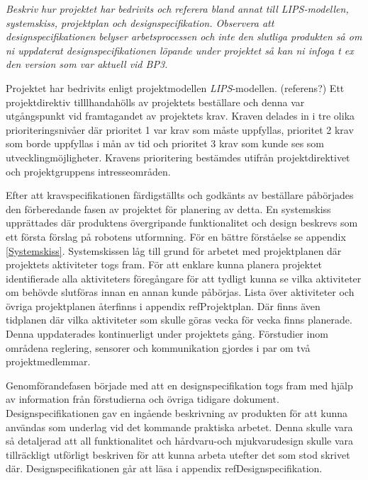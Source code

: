 \documentclass[11pt]{article}
\begin{document}
\begin{flushleft}
\textit{Beskriv hur projektet har bedrivits och referera bland annat till LIPS-modellen, systemskiss, projektplan och designspecifikation. Observera att designspecifikationen belyser arbetsprocessen och inte den slutliga produkten så om ni uppdaterat designspecifikationen löpande under projektet så kan ni infoga t ex den version som var aktuell vid BP3.}


Projektet har bedrivits enligt projektmodellen \textit{LIPS}-modellen. (referens?) Ett projektdirektiv tilllhandahölls av projektets beställare och denna var utgångspunkt vid framtagandet av projektets krav. Kraven delades in i tre olika prioriteringsnivåer där prioritet 1 var krav som måste uppfyllas, prioritet 2 krav som borde uppfyllas i mån av tid och prioritet 3 krav som kunde ses som utvecklingmöjligheter. Kravens prioritering bestämdes utifrån projektdirektivet och projektgruppens intresseområden. 

Efter att  kravspecifikationen färdigställts och godkänts av beställare påbörjades den förberedande fasen av projektet för planering av detta. En systemskiss upprättades där produktens övergripande funktionalitet och design beskrevs som ett första förslag på robotens utformning. För en bättre förståelse se appendix \ref{Systemskiss}. Systemskissen låg till grund för arbetet med projektplanen där projektets aktiviteter togs fram. För att enklare kunna planera projektet identifierade alla aktiviteters föregångare för att tydligt kunna se vilka aktiviteter om behövde slutföras innan en annan kunde påbörjas. Lista över aktiviteter och övriga projektplanen återfinns i appendix ref{Projektplan}. Där finns även tidplanen där vilka aktiviteter som skulle göras vecka för vecka finns planerade. Denna uppdaterades kontinuerligt under projektets gång. Förstudier inom områdena reglering, sensorer och kommunikation gjordes i par om två projektmedlemmar. 

Genomförandefasen började med att en designspecifikation togs fram med hjälp av information från förstudierna och övriga tidigare dokument. Designspecifikationen gav en ingående beskrivning av produkten för att kunna användas som underlag vid det kommande praktiska arbetet. Denna skulle vara så detaljerad att all funktionalitet och hårdvaru-och mjukvarudesign skulle vara tillräckligt utförligt beskriven för att kunna arbeta utefter det som stod skrivet där. Designspecifikationen går att läsa i appendix ref{Designspecifikation}. 


\end{flushleft}
\end{document}
